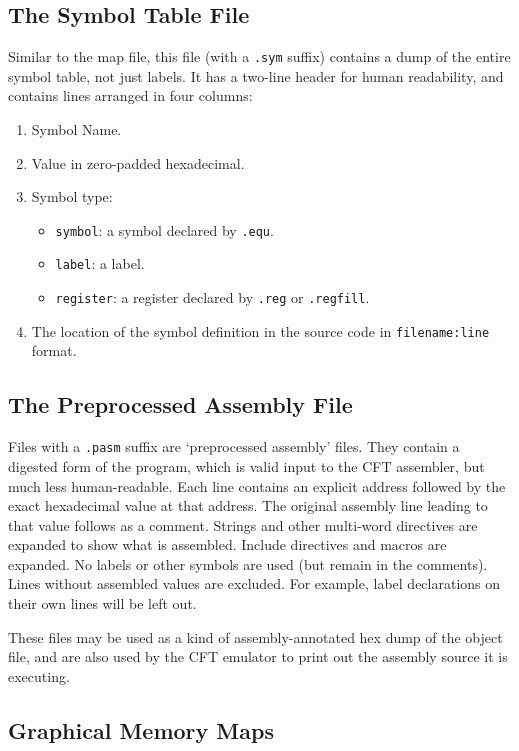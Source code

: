 \documentclass[11pt,a4paper,twocolumns]{article}
\newcommand\f[1]{{\color{black}\texttt{#1}}}
\begin{document}
\subsection{The Symbol Table File}

Similar to the map file, this file (with a {\tt .sym} suffix) contains a dump
of the entire symbol table, not just labels. It has a two-line header for human
readability, and contains lines arranged in four columns:

\begin{enumerate}
\item Symbol Name.
\item Value in zero-padded hexadecimal.
\item Symbol type:
  \begin{itemize}
  \item \f{symbol}: a symbol declared by \f{.equ}.
  \item \f{label}: a label.
  \item \f{register}: a register declared by \f{.reg} or \f{.regfill}.
  \end{itemize}
  \item The location of the symbol definition in the source code in {\tt filename:line} format.
\end{enumerate}

\subsection{The Preprocessed Assembly File}

Files with a {\tt .pasm} suffix are ‘preprocessed assembly’ files. They contain
a digested form of the program, which is valid input to the CFT assembler, but
much less human-readable. Each line contains an explicit address followed by
the exact hexadecimal value at that address. The original assembly line leading
to that value follows as a comment. Strings and other multi-word directives are
expanded to show what is assembled. Include directives and macros are
expanded. No labels or other symbols are used (but remain in the
comments). Lines without assembled values are excluded. For example, label
declarations on their own lines will be left out.

These files may be used as a kind of assembly-annotated hex dump of the object
file, and are also used by the CFT emulator to print out the assembly source it
is executing.

\subsection{Graphical Memory Maps}
\end{document}
